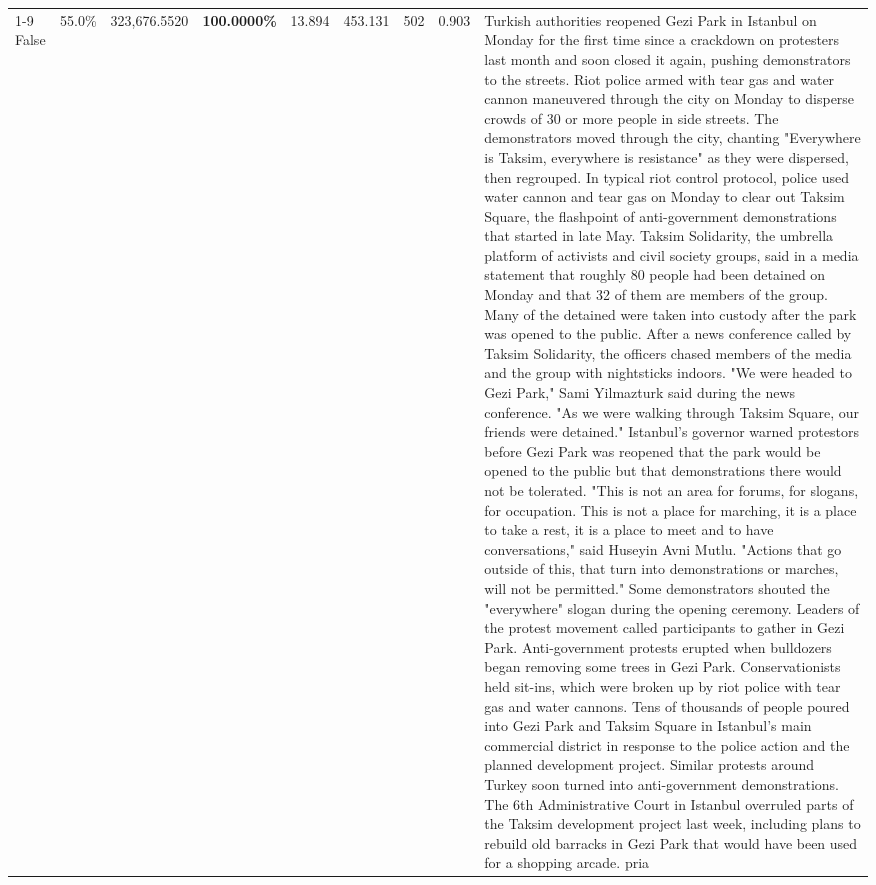 \begin{table}[H]
\begin{tabular}{lllrlllll}
\cline{1-9}
False & 55.0\% & 323,676.5520 & \bfseries \color{red} 100.0000\% & 13.894 & 453.131 & 502 & 0.903 & Turkish authorities reopened Gezi Park in Istanbul on Monday for the first time since a crackdown on protesters last month and soon closed it again, pushing demonstrators to the streets. Riot police armed with tear gas and water cannon maneuvered through the city on Monday to disperse crowds of 30 or more people in side streets. The demonstrators moved through the city, chanting "Everywhere is Taksim, everywhere is resistance" as they were dispersed, then regrouped. In typical riot control protocol, police used water cannon and tear gas on Monday to clear out Taksim Square, the flashpoint of anti-government demonstrations that started in late May. Taksim Solidarity, the umbrella platform of activists and civil society groups, said in a media statement that roughly 80 people had been detained on Monday and that 32 of them are members of the group. Many of the detained were taken into custody after the park was opened to the public. After a news conference called by Taksim Solidarity, the officers chased members of the media and the group with nightsticks indoors. "We were headed to Gezi Park," Sami Yilmazturk said during the news conference. "As we were walking through Taksim Square, our friends were detained." Istanbul's governor warned protestors before Gezi Park was reopened that the park would be opened to the public but that demonstrations there would not be tolerated. "This is not an area for forums, for slogans, for occupation. This is not a place for marching, it is a place to take a rest, it is a place to meet and to have conversations," said Huseyin Avni Mutlu. "Actions that go outside of this, that turn into demonstrations or marches, will not be permitted." Some demonstrators shouted the "everywhere" slogan during the opening ceremony. Leaders of the protest movement called participants to gather in Gezi Park. Anti-government protests erupted when bulldozers began removing some trees in Gezi Park. Conservationists held sit-ins, which were broken up by riot police with tear gas and water cannons. Tens of thousands of people poured into Gezi Park and Taksim Square in Istanbul's main commercial district in response to the police action and the planned development project. Similar protests around Turkey soon turned into anti-government demonstrations. The 6th Administrative Court in Istanbul overruled parts of the Taksim development project last week, including plans to rebuild old barracks in Gezi Park that would have been used for a shopping arcade. pria \\

\end{tabular}
\end{table}

